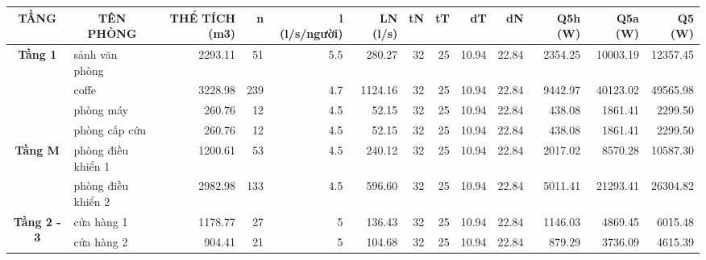 \begin{landscape}
	\begin{table}[H]
		\vspace{1.3cm}
		\centering
		\begin{adjustbox}{width=1.5\textheight, height=0.4\textwidth}
		\begin{tabular}{|c|l|r|r|r|r|r|r|r|r|r|r|r|}
			\hline
			\textbf{TẦNG} & \multicolumn{1}{c|}{\textbf{TÊN PHÒNG}} & \multicolumn{1}{p{5.285em}|}{\textbf{THỂ TÍCH (m3) }} & \multicolumn{1}{p{4.07em}|}{\textbf{n}} & \multicolumn{1}{p{5.5em}|}{\textbf{l (l/s/người)}} & \multicolumn{1}{p{6.645em}|}{\textbf{LN (l/s)}} & \multicolumn{1}{p{4.07em}|}{\textbf{tN}} & \multicolumn{1}{p{4.07em}|}{\textbf{tT}} & \multicolumn{1}{p{4.07em}|}{\textbf{dT}} & \multicolumn{1}{p{4.07em}|}{\textbf{dN}} & \multicolumn{1}{p{5.855em}|}{\textbf{Q5h (W)}} & \multicolumn{1}{p{6em}|}{\textbf{Q5a (W)}} & \multicolumn{1}{p{6.715em}|}{\textbf{Q5 (W)}} \bigstrut\\
			\hline
			\multirow{4}[8]{*}{\textbf{Tầng 1}} & sảnh văn phòng & 2293.11  & 51       & 5.5      & 280.27   & 32       & 25       & 10.94    & 22.84    & 2354.25  & 10003.19 & 12357.45 \bigstrut\\
			\cline{2-13}             & coffe    & 3228.98  & 239      & 4.7      & 1124.16  & 32       & 25       & 10.94    & 22.84    & 9442.97  & 40123.02 & 49565.98 \bigstrut\\
			\cline{2-13}             & phòng máy & 260.76   & 12       & 4.5      & 52.15    & 32       & 25       & 10.94    & 22.84    & 438.08   & 1861.41  & 2299.50 \bigstrut\\
			\cline{2-13}             & phòng cấp cứu & 260.76   & 12       & 4.5      & 52.15    & 32       & 25       & 10.94    & 22.84    & 438.08   & 1861.41  & 2299.50 \bigstrut\\
			\hline
			\multirow{2}[4]{*}{\textbf{Tầng M}} & phòng điều khiển 1 & 1200.61  & 53       & 4.5      & 240.12   & 32       & 25       & 10.94    & 22.84    & 2017.02  & 8570.28  & 10587.30 \bigstrut\\
			\cline{2-13}             & phòng điều khiển 2 & 2982.98  & 133      & 4.5      & 596.60   & 32       & 25       & 10.94    & 22.84    & 5011.41  & 21293.41 & 26304.82 \bigstrut\\
			\hline
			\multirow{6}[12]{*}{\textbf{Tầng 2 - 3}} & cửa hàng 1 & 1178.77  & 27       & 5        & 136.43   & 32       & 25       & 10.94    & 22.84    & 1146.03  & 4869.45  & 6015.48 \bigstrut\\
			\cline{2-13}             & cửa hàng 2 & 904.41   & 21       & 5        & 104.68   & 32       & 25       & 10.94    & 22.84    & 879.29   & 3736.09  & 4615.39 \bigstrut\\

\end{tabular}
\end{adjustbox}
\end{table}
\end{landscape}

